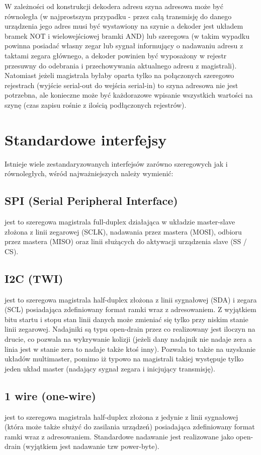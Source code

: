 \documentclass{pdfBooklets}
\begin{document}
W zależności od konstrukcji dekodera adresu szyna adresowa może być równoległa (w najprostszym przypadku - przez całą transmisję do danego urządzenia jego adres musi być wystawiony na szynie a dekoder jest układem bramek NOT i wielowejściowej bramki AND) lub szeregowa (w takim wypadku powinna posiadać własny zegar lub sygnał informujący o nadawaniu adresu z taktami zegara głównego, a dekoder powinien być wyposażony w rejestr przesuwny do odebrania i przechowywania aktualnego adresu z magistrali). Natomiast jeżeli magistrala byłaby oparta tylko na połączonych szeregowo rejestrach (wyjście serial-out do wejścia serial-in) to szyna adresowa nie jest potrzebna, ale konieczne może być każdorazowe wpisanie wszystkich wartości na szynę (czas zapisu rośnie z ilością podłączonych rejestrów).

\section{Standardowe interfejsy}

Istnieje wiele zestandaryzowanych interfejsów zarówno szeregowych jak i równoległych, wśród najważniejszych należy wymienić:

\subsection{SPI (Serial Peripheral Interface)}
    jest to szeregowa magistrala full-duplex działająca w układzie master-slave złożona z linii zegarowej (SCLK), nadawania przez mastera (MOSI), odbioru przez mastera (MISO) oraz linii służących do aktywacji urządzenia slave (SS / CS). 
\subsection{I2C (TWI)}
    jest to szeregowa magistrala half-duplex złożona z linii sygnałowej (SDA) i zegara (SCL) posiadająca zdefiniowany format ramki wraz z adresowaniem. Z wyjątkiem bitu startu i stopu stan linii danych może zmieniać się tylko przy niskim stanie linii zegarowej.
    Nadajniki są typu open-drain przez co realizowany jest iloczyn na drucie, co pozwala na wykrywanie kolizji (jeżeli dany nadajnik nie nadaje zera a linia jest w stanie zera to nadaje także ktoś inny). Pozwala to także na uzyskanie układów multimaster, pomimo iż typowo na magistrali takiej występuje tylko jeden układ master (nadający sygnał zegara i inicjujący transmisję). 
\subsection{1 wire (one-wire)}
    jest to szeregowa magistrala half-duplex złożona z jedynie z linii sygnałowej (która może także służyć do zasilania urządzeń) posiadająca zdefiniowany format ramki wraz z adresowaniem. Standardowe nadawanie jest realizowane jako open-drain (wyjątkiem jest nadawanie tzw power-byte). 
\end{document}
